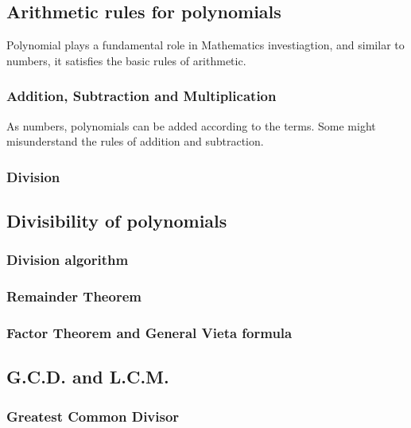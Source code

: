 \documentclass[12pt]{article}
\begin{document}
    \subsection{Arithmetic rules for polynomials}

    Polynomial plays a fundamental role in Mathematics investiagtion, and similar to numbers, it satisfies the basic rules of arithmetic.

    \subsubsection*{Addition, Subtraction and Multiplication}

    As numbers, polynomials can be added according to the terms. Some might misunderstand the rules of addition and subtraction.

    

    \subsubsection*{Division}

    \subsection{Divisibility of polynomials}

    \subsubsection*{Division algorithm}

    \subsubsection*{Remainder Theorem}

    \subsubsection*{Factor Theorem and General Vieta formula}

    \subsection{G.C.D. and L.C.M.}

    \subsubsection*{Greatest Common Divisor}
\end{document}
